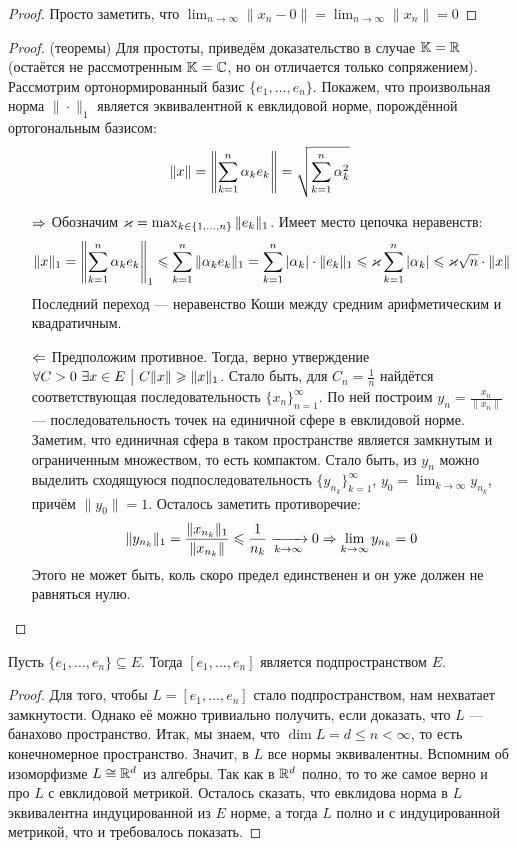 \begin{proof}
	Просто заметить, что $\lim_{n \to \infty} \|x_n - 0\| = \lim_{n \to \infty} \|x_n\| = 0$
\end{proof}

\begin{proof} (теоремы)
	Для простоты, приведём доказательство в случае $\mathbb{K} = \mathbb{R}$ (остаётся не рассмотренным $\mathbb{K} = \mathbb{C}$, но он отличается только сопряжением). Рассмотрим ортонормированный базис $\{e_1, \ldots, e_n\}$. Покажем, что произвольная норма $\|\cdot\|_1$ является эквивалентной к евклидовой норме, порождённой ортогональным базисом:
	\[
		\|x\| = \left\|\sum_{k = 1}^n \alpha_k e_k\right\| = \sqrt{\sum_{k = 1}^n \alpha_k^2}
	\]
	\begin{itemize}
		\item[$\Rightarrow$] Обозначим $\varkappa = \max_{k \in \{1, \ldots, n\}} \|e_k\|_1$. Имеет место цепочка неравенств:
		\[
			\|x\|_1 = \left\|\sum_{k = 1}^n \alpha_ke_k\right\|_1 \leqslant \sum_{k = 1}^n \|\alpha_ke_k\|_1 = \sum_{k = 1}^n |\alpha_k| \cdot \|e_k\|_1 \leqslant \varkappa \sum_{k = 1}^n |\alpha_k| \leqslant \varkappa \sqrt{n} \cdot \|x\|
		\]
		Последний переход --- неравенство Коши между средним арифметическим и квадратичным.
		
		\item[$\Leftarrow$] Предположим противное. Тогда, верно утверждение $\forall C > 0\ \exists x \in E \ \big|\  C\|x\| \geqslant \|x\|_1$. Стало быть, для $C_n = \frac{1}{n}$ найдётся соответствующая последовательность $\{x_n\}_{n = 1}^\infty$. По ней построим $y_n = \frac{x_n}{\|x_n\|}$ --- последовательность точек на единичной сфере в евклидовой норме. Заметим, что единичная сфера в таком пространстве является замкнутым и ограниченным множеством, то есть компактом. Стало быть, из $y_n$ можно выделить сходящуюся подпоследовательность $\{y_{n_k}\}_{k = 1}^\infty$, $y_0 = \lim_{k \to \infty} y_{n_k}$, причём $\|y_0\| = 1$. Осталось заметить противоречие:
		\[
			\|y_{n_k}\|_1 = \frac{\|x_{n_k}\|_1}{\|x_{n_k}\|} \leqslant \frac{1}{n_k} \xrightarrow[k \to \infty]{} 0 \Rightarrow \lim_{k \to \infty} y_{n_k} = 0
		\]
		Этого не может быть, коль скоро предел единственен и он уже должен не равняться нулю.
	\end{itemize}
\end{proof}

\begin{theorem}
	Пусть $\{e_1, \ldots, e_n\} \subseteq E$. Тогда $[e_1, \ldots, e_n]$ является подпространством $E$.
\end{theorem}

\begin{proof}
	Для того, чтобы $L = [e_1, \ldots, e_n]$ стало подпространством, нам нехватает замкнутости. Однако её можно тривиально получить, если доказать, что $L$ --- банахово пространство. Итак, мы знаем, что $\dim L = d \le n < \infty$, то есть конечномерное пространство. Значит, в $L$ все нормы эквивалентны. Вспомним об изоморфизме $L \cong \mathbb{R}^d$ из алгебры. Так как в $\mathbb{R}^d$ полно, то то же самое верно и про $L$ с евклидовой метрикой. Осталось сказать, что евклидова норма в $L$ эквивалентна индуцированной из $E$ норме, а тогда $L$ полно и с индуцированной метрикой, что и требовалось показать.
\end{proof}

